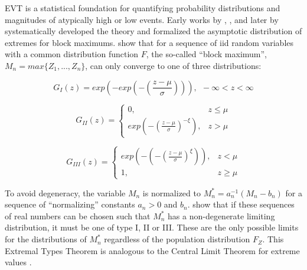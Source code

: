 \Acrfull{EVT} is a statistical foundation for quantifying probability distributions and magnitudes of atypically high or low events. Early works by \cite{frechet1927loi}, \cite{fisher1928limiting}, \cite{mises1936distribution} and later by \cite{gnedenko1943distribution}  systematically developed the theory and formalized the asymptotic distribution of extremes for block maximums. \cite{fisher1928limiting} show that for a sequence of \gls{iid} random variables with a common distribution function $F$, the so-called ``block maximum'', $M_n = max\{Z_1,...,Z_n\}$, can only converge to one of three distributions:

\begin{equation}
    G_{I}(z) = exp\left(-exp\left(-\left(\frac{z-\mu}{\sigma}\right)\right)\right), \ \ -\infty < z < \infty
    \label{eq:1}
\end{equation}

\begin{equation}
    G_{II}(z) =
    \begin{cases}
        0,                                                           & z \leq \mu \\
        exp\left(-\left( \frac{z-\mu}{\sigma} \right)^{-\xi}\right), & z > \mu
    \end{cases}
    \label{eq:2}
\end{equation}

\begin{equation}
    G_{III}(z) =
    \begin{cases}
        exp\left(-\left( -\left(\frac{z-\mu}{\sigma} \right)^{\xi} \right) \right), & z < \mu    \\
        1,                                                                          & z \geq \mu
    \end{cases}
    \label{eq:3}
\end{equation}

To avoid degeneracy, the variable $M_n$ is normalized to $M_n^* = a_n^{-1}(M_n - b_n)$ for a sequence of ``normalizing'' constants $a_n > 0$ and $b_n$. \cite{fisher1928limiting} show that if these sequences of real numbers can be chosen such that $M_n^*$ has a non-degenerate limiting distribution, it must be one of type I, II or III. These are the only possible limits for the distributions of $M_n^*$ regardless of the population distribution $F_{Z}$. This Extremal Types Theorem is analogous to the Central Limit Theorem for extreme values \citep{coles2001introduction}.

